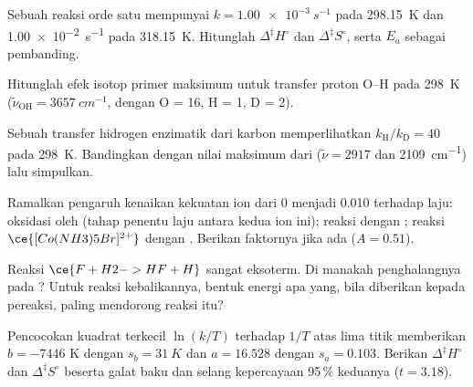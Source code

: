 \begin{exercise}[$\star\star$]\label{exo:b3:rate-theories:5}
Sebuah reaksi orde satu mempunyai $k = \qty{1.00e-3}{s^{-1}}$ pada \qty{298.15}{K}
dan \qty{1.00e-2}{s^{-1}} pada \qty{318.15}{K}. Hitunglah $\Delta^{\ddagger}H^\circ$ dan
$\Delta^{\ddagger}S^\circ$, serta $E_a$ sebagai pembanding.
\end{exercise}

\begin{exercise}[$\star\star$]\label{exo:b3:rate-theories:6}
Hitunglah efek isotop primer maksimum untuk transfer proton O--H pada
\qty{298}{K} ($\tilde\nu_{\mathrm{OH}} = \qty{3657}{cm^{-1}}$,  dengan O = 16,
H = 1, D = 2).
\end{exercise}

\begin{exercise}[$\star\star$]\label{exo:b3:rate-theories:7}
Sebuah transfer hidrogen enzimatik dari karbon memperlihatkan
$k_{\mathrm H}/k_{\mathrm D} = 40$ pada \qty{298}{K}. Bandingkan dengan nilai maksimum
dari  ($\tilde\nu = 2917$ dan \qty{2109}{cm^{-1}}) lalu
simpulkan.
\end{exercise}

\begin{exercise}[$\star\star$]\label{exo:b3:rate-theories:8}
Ramalkan pengaruh kenaikan kekuatan ion dari 0 menjadi 0.010 terhadap laju:
oksidasi  oleh  (tahap penentu laju antara kedua ion ini);
reaksi  dengan ; reaksi $\ce{[Co(NH3)5Br]^{2+}}$ dengan
. Berikan faktornya jika ada ($A = 0.51$).
\end{exercise}

\begin{exercise}[$\star\star$]\label{exo:b3:rate-theories:9}
Reaksi $\ce{F + H2 -> HF + H}$ sangat eksoterm. Di manakah penghalangnya pada
? Untuk reaksi kebalikannya, bentuk energi apa yang,
bila diberikan kepada pereaksi, paling mendorong reaksi itu?
\end{exercise}

\begin{exercise}[$\star\star\star$]\label{exo:b3:rate-theories:10}
Pencocokan kuadrat terkecil $\ln(k/T)$ terhadap $1/T$ atas lima titik memberikan
$b = -7446$ K dengan $s_b = \qty{31}{K}$ dan $a = 16.528$ dengan $s_a = 0.103$.
Berikan $\Delta^{\ddagger}H^\circ$ dan $\Delta^{\ddagger}S^\circ$ beserta galat baku dan
selang kepercayaan 95\,\% keduanya ($t = 3.18$).
\end{exercise}

